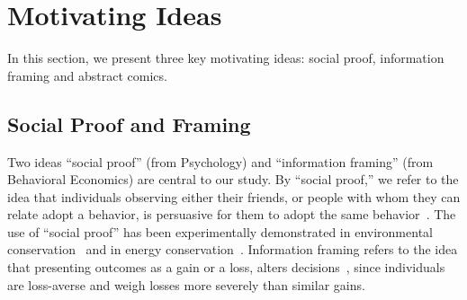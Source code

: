 \section{Motivating Ideas}
\label{sec:Motivating Ideas}
In this section, we present three key motivating ideas: social proof, information framing and abstract comics.

\subsection{Social Proof and Framing}
Two ideas ``social proof'' (from Psychology) and ``information framing'' (from Behavioral Economics) are central to our study. By ``social proof,'' we refer to the idea that individuals observing either their friends, or people with whom they can relate adopt a behavior, is persuasive for them to adopt the same behavior~\cite{Cialdini1993,Cialdini2004}. The use of ``social proof'' has been experimentally demonstrated in environmental conservation~\cite{goldstein2008room} and in energy conservation~\cite{schultz2007constructive}. Information framing refers to the idea that presenting outcomes as a gain or a loss, alters decisions~\cite{tversky1981framing,tversky1992advances}, since individuals are loss-averse and weigh losses more severely than similar gains.



